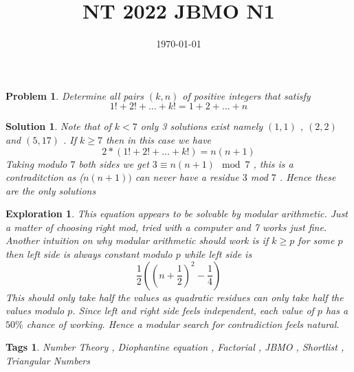 \documentclass{article}
\title{NT 2022 JBMO N1}
\date{\today}
\newtheorem*{problem}{Problem}
\newtheorem*{solution}{Solution}
\newtheorem*{exploration}{Exploration}
\newtheorem*{tags}{Tags}
\begin{document}
	
	\maketitle
	
	\begin{problem}
		Determine all pairs $(k,n)$ of positive integers that satisfy
		\[1! + 2! + \dots + k! = 1 + 2 + \dots + n \]
	\end{problem}
	
	\begin{solution}
		Note that of $k<7$ only 3 solutions exist namely $(1,1)$ , $(2,2)$ and $(5,17)$ . If $k \geq 7 $ then in this case we have 
		\[2*(1! + 2! + \dots + k!) = n(n+1)\]
		Taking modulo $7$ both sides we get
		$ 3 \equiv n(n+1) \mod 7$ , this is a contraditction as ($n(n+1)) $ can never have a residue $3$ mod $7$ . Hence these are the only solutions
	\end{solution}
	
	\begin{exploration}
		This equation appears to be solvable by modular arithmetic. Just a matter of choosing right mod, tried with a computer and 7 works just fine. Another intuition on why modular arithmetic should work is if $k \geq p$ for some $p$ then left side is always constant modulo $p$ while left side is 
		\[\frac{1}{2}\left( \left( n + \frac{1}{2} \right)^{2} - \dfrac{1}{4}\right)   \]
		This should only take half the values as quadratic residues can only take half the values modulo $p$. Since left and right side feels independent, each value of $p$ has a $50 \%$ chance of working. Hence a modular search for contradiction feels natural.
	\end{exploration}
	
	\begin{tags}
		Number Theory ,  Diophantine equation , Factorial , JBMO , Shortlist , Triangular Numbers
	\end{tags}
	
\end{document}

